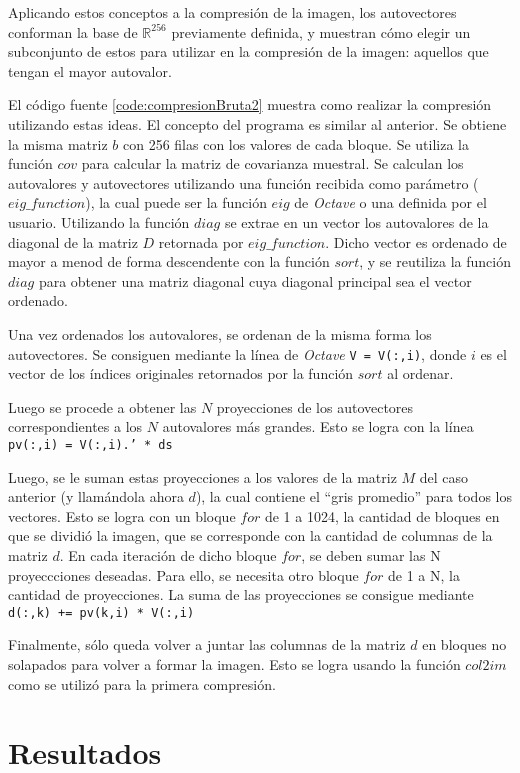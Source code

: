 \documentclass[twocolumn,a4paper,10pt]{article}
\begin{document}
Aplicando estos conceptos a la compresión de la imagen, los autovectores conforman la base de $\mathbb{R}^{256}$ previamente definida, y muestran cómo elegir un subconjunto de estos para utilizar en la compresión de la imagen: aquellos que tengan el mayor autovalor.

El código fuente \ref{code:compresionBruta2} muestra como realizar la compresión utilizando estas ideas. El concepto del programa es similar al anterior. Se obtiene la misma matriz $b$ con 256 filas con los valores de cada bloque. Se utiliza la función $cov$ para calcular la matriz de covarianza muestral. Se calculan los autovalores y autovectores utilizando una función recibida como parámetro ($eig\_function$), la cual puede ser la función $eig$ de \textit{Octave} o una definida por el usuario. Utilizando la función $diag$ se extrae en un vector los autovalores de la diagonal de la matriz $D$ retornada por $eig\_function$. Dicho vector es ordenado de mayor a menod de forma descendente con la función $sort$, y se reutiliza la función $diag$ para obtener una matriz diagonal cuya diagonal principal sea el vector ordenado.

Una vez ordenados los autovalores, se ordenan de la misma forma los autovectores. Se consiguen mediante la línea de \textit{Octave} \texttt{V = V(:,i)}, donde $i$ es el vector de los índices originales retornados por la función $sort$ al ordenar.

Luego se procede a obtener las $N$ proyecciones de los autovectores correspondientes a los $N$ autovalores más grandes. Esto se logra con la línea \texttt{pv(:,i) = V(:,i).' * ds}

Luego, se le suman estas proyecciones a los valores de la matriz $M$ del caso anterior (y llam\'andola ahora $d$), la cual contiene el ``gris promedio'' para todos los vectores. Esto se logra con un bloque $for$ de 1 a 1024, la cantidad de bloques en que se dividió la imagen, que se corresponde con la cantidad de columnas de la matriz $d$. En cada iteración de dicho bloque $for$, se deben sumar las N proyeccciones deseadas. Para ello, se necesita otro bloque $for$ de 1 a N, la cantidad de proyecciones. La suma de las proyecciones se consigue mediante \texttt{d(:,k)\: += pv(k,i) * V(:,i)}

Finalmente, s\'olo queda volver a juntar las columnas de la matriz $d$ en bloques no solapados para volver a formar la imagen. Esto se logra usando la funci\'on 
$col2im$ como se utilizó para la primera compresi\'on.

\section{Resultados}
\end{document}
